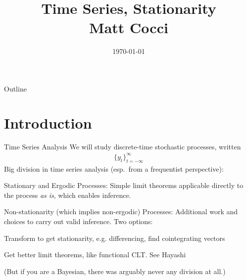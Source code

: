 \documentclass[aspectratio=169, handout]{beamer}
\title[]{Time Series, Stationarity \\ Matt Cocci}
\author[]{}
\date{\today}
\begin{document}
\begin{frame}[plain]
\titlepage
\end{frame}


\begin{frame}{Outline}
\tableofcontents[hideallsubsections]
\end{frame}


\section{Introduction}

{\footnotesize
\begin{frame}{Time Series Analysis}
We will study \alert{discrete-time stochastic processes}, written
\begin{align*}
  \{y_t\}_{t=-\infty}^\infty
\end{align*}
Big division in time series analysis (esp.\ from a frequentist
perspective):
\begin{itemize}
  {\footnotesize
  \item \alert{Stationary and Ergodic Processes}:
    Simple limit theorems applicable \alert{directly} to the process
    \emph{as is}, which enables inference.

  \pause
  \item \alert{Non-stationarity} (which implies non-ergodic) Processes:
    \alert{Additional work} and choices to carry out valid inference.
    Two options:
    \begin{enumerate}
      {\footnotesize
      \item \alert{Transform} to get stationarity, e.g.
        \alert{differencing}, find
        \alert{cointegrating vectors}
      \item Get better limit theorems, like
        \alert{functional CLT}. See Hayashi
      }
    \end{enumerate}
  }
  \pause
\end{itemize}
\pause
(But if you are a Bayesian, there was arguably never any division at
all.)
\end{frame}
}
\end{document}
